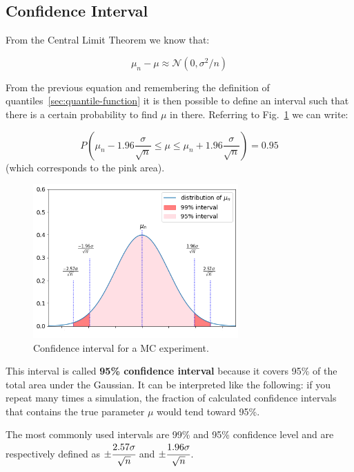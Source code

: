 \subsection{Confidence Interval}

From the Central Limit Theorem we know that: 

\begin{equation}
\mu_n - \mu \approx \mathcal{N}(0, \sigma^2/n)
\end{equation}

From the previous equation and remembering the definition of quantiles~\ref{sec:quantile-function} it is then possible to define an interval such that there is a certain probability to find $\mu$ in there. Referring to Fig.~\ref{fig:confidence_interval} we can write:

\begin{equation}
P\left(\mu_n - 1.96\frac{\sigma}{\sqrt{n}}\le \mu \le \mu_n + 1.96\frac{\sigma}{\sqrt{n}}\right) = 0.95
\end{equation}
(which corresponds to the pink area).

\begin{figure}[htb]
\centering
\includegraphics[width=0.7\textwidth]{figures/confidence_interval}
\caption{Confidence interval for a MC experiment.}
\label{fig:confidence_interval}
\end{figure}

This interval is called \textbf{95\% confidence interval} because it covers 95\% of the total area under the Gaussian. It can be interpreted like the following: if you repeat many times a simulation, the fraction of calculated confidence intervals that contains the true parameter $\mu$ would tend toward 95\%.

The most commonly used intervals are 99\% and 95\% confidence level and are respectively defined as \(\pm \cfrac{2.57\sigma}{\sqrt{n}}\) and \(\pm \cfrac{1.96\sigma}{\sqrt{n}}\).

